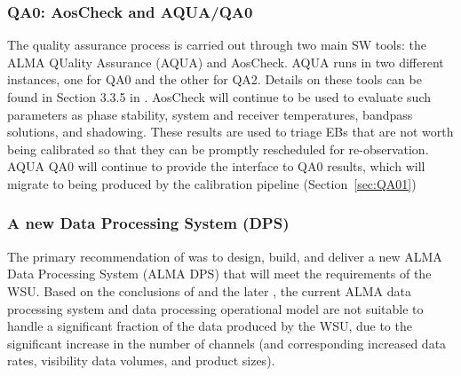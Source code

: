 \subsubsection{QA0: AosCheck and AQUA/QA0}
The quality assurance process is carried out through two main SW tools: the ALMA QUality Assurance (AQUA) and AosCheck. AQUA runs in two different instances, one for QA0 and the other for QA2. Details on these tools can be found in Section 3.3.5 in \cite{CSA-IA}.
AosCheck will continue to be used to 
evaluate such parameters as phase stability, system and receiver temperatures, bandpass solutions, and shadowing.  These results are used to
triage EBs that are not worth being calibrated so that they can be promptly rescheduled for re-observation. 
AQUA QA0 will continue to provide the interface
to QA0 results, which will migrate to being produced by the calibration pipeline (Section~\ref{sec:QA01})


\subsubsection{A new Data Processing System (DPS)}

The primary recommendation of \cite{dpda} was to design, build, and deliver a new ALMA Data Processing System (ALMA DPS) that will meet the requirements of the WSU. Based on the conclusions of \cite{dpda} and the later \cite{dp}, the current ALMA data processing system and data processing operational model are not suitable to handle a significant fraction of the data produced by the WSU, due to the significant increase in the number of channels (and corresponding increased data rates, visibility data volumes, and product sizes). 

